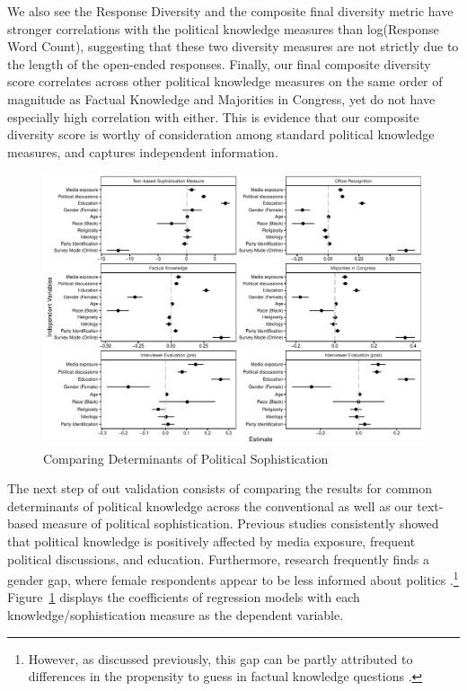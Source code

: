 \documentclass[12pt]{article}
\begin{document}
We also see the Response Diversity and the composite final diversity metric have stronger correlations with the political knowledge measures than log(Response Word Count), suggesting that these two diversity measures are not strictly due to the length of the open-ended responses.  Finally, our final composite diversity score correlates across other political knowledge measures on the same order of magnitude as Factual Knowledge and Majorities in Congress, yet do not have especially high correlation with either.  This is evidence that our composite diversity score is worthy of consideration among standard political knowledge measures, and captures independent information.    

\begin{figure}[h]
\includegraphics[width=\textwidth]{../fig/models.pdf}
\caption{Comparing Determinants of Political Sophistication}\label{fig:models}
\end{figure}

The next step of out validation consists of comparing the results for common determinants of political knowledge across the conventional as well as our text-based measure of political sophistication. Previous studies consistently showed that political knowledge is positively affected by media exposure, frequent political discussions, and education. Furthermore, research frequently finds a gender gap, where female respondents appear to be less informed about politics \citep[c.f.][]{barabas2014question}.\footnote{However, as discussed previously, this gap can be partly attributed to differences in the propensity to guess in factual knowledge questions \citep[e.g.][]{mondak2004knowledge}.} Figure~\ref{fig:models} displays the coefficients of regression models with each knowledge/sophistication measure as the dependent variable.
\end{document}
